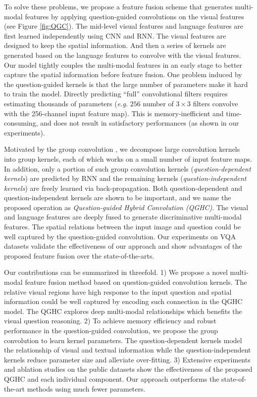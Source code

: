 \documentclass[runningheads]{llncs}
\begin{document}
To solve these problems, we propose a feature fusion scheme that generates multi-modal features by applying question-guided convolutions on the visual features (see Figure \ref{fig:QGC}). The mid-level visual features and language features are first learned independently using CNN and RNN. The visual features are designed to keep the spatial information. And then a series of kernels are generated based on the language features to convolve with the visual features.
Our model tightly couples the multi-modal features in an early stage to better capture the spatial information before feature fusion. 
One problem induced by the question-guided kernels is that the large number of parameters make it hard to train the model. Directly predicting ``full'' convolutional filters requires estimating thousands of parameters (\textit{e.g.} $256$ number of $3\times3$ filters convolve with the 256-channel input feature map). This is memory-inefficient and time-consuming, and does not result in satisfactory performances (as shown in our experiments).

Motivated by the group convolution \cite{chollet2016xception,krizhevsky2012imagenet,xie2016aggregated}, we decompose large convolution kernels into group kernels, each of which works on a small number of input feature maps. In addition, only a portion of such group convolution kernels (\emph{question-dependent kernels}) are predicted by RNN and the remaining kernels (\emph{question-independent kernels}) are freely learned via back-propagation. Both question-dependent and question-independent 
kernels are shown to be important, and we name the proposed operation as \emph{Question-guided Hybrid Convolution (QGHC)}. The visual and language features are deeply fused to generate discriminative multi-modal features. The spatial relations between the input image and question could be well captured by the question-guided convolution. Our experiments on VQA datasets validate the effectiveness of our approach and show advantages of the proposed feature fusion over the state-of-the-arts.

Our contributions can be summarized in threefold. 1) We propose a novel multi-modal feature fusion method based on question-guided convolution kernels. The relative visual regions have high response to the input question and spatial information could be well captured by encoding such connection in the QGHC model. The QGHC explores deep multi-modal relationships which benefits the visual question reasoning.
2) To achieve memory efficiency and robust performance in the question-guided convolution, we propose the group convolution to learn kernel parameters. The question-dependent kernels model the relationship of visual and textual information while the question-independent kernels reduce parameter size and alleviate over-fitting.
3) Extensive experiments and ablation studies on the public datasets show the effectiveness of the proposed QGHC and each individual component. Our approach outperforms the state-of-the-art methods using much fewer parameters.
\end{document}
